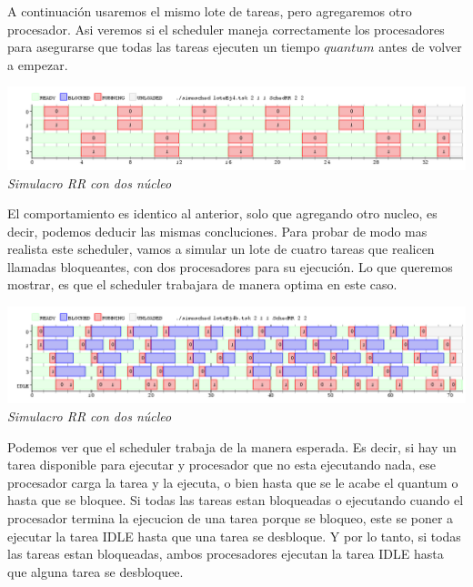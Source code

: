 A continuaci\'on usaremos el mismo lote de tareas, pero agregaremos otro procesador. Asi veremos si el scheduler maneja correctamente 
los procesadores para asegurarse que todas las tareas ejecuten un tiempo $quantum$ antes de volver a empezar.

\vspace{\baselineskip}
\begin{center}
\includegraphics[scale=0.45]{../tp1/Test/resEj4Co2SB.png}
\\
\vspace{1pt}
\footnotesize\textit{Simulacro RR con dos n\'ucleo}
\end{center}
\vspace{\baselineskip}

El comportamiento es identico al anterior, solo que agregando otro nucleo, es decir, podemos deducir las mismas concluciones. Para probar de 
modo mas realista este scheduler, vamos a simular un lote de cuatro tareas que realicen llamadas bloqueantes, con dos procesadores para su ejecuci\'on.
Lo que queremos mostrar, es que el scheduler trabajara de manera optima en este caso.

\vspace{\baselineskip}
\begin{center}
\includegraphics[scale=0.45]{../tp1/Test/resEj4Co2CB.png}
\\
\vspace{1pt}
\footnotesize\textit{Simulacro RR con dos n\'ucleo}
\end{center}
\vspace{\baselineskip}

Podemos ver que el scheduler trabaja de la manera esperada. Es decir, si hay un tarea disponible para ejecutar y procesador que no esta ejecutando nada,
ese procesador carga la tarea y la ejecuta, o bien hasta que se le acabe el quantum o hasta que se bloquee. Si todas las tareas estan bloqueadas 
o ejecutando cuando el procesador termina la ejecucion de una tarea porque se bloqueo, este se poner a ejecutar la tarea IDLE hasta que 
una tarea se desbloque. Y por lo tanto, si todas las tareas estan bloqueadas, ambos procesadores ejecutan la tarea IDLE hasta que alguna 
tarea se desbloquee.



